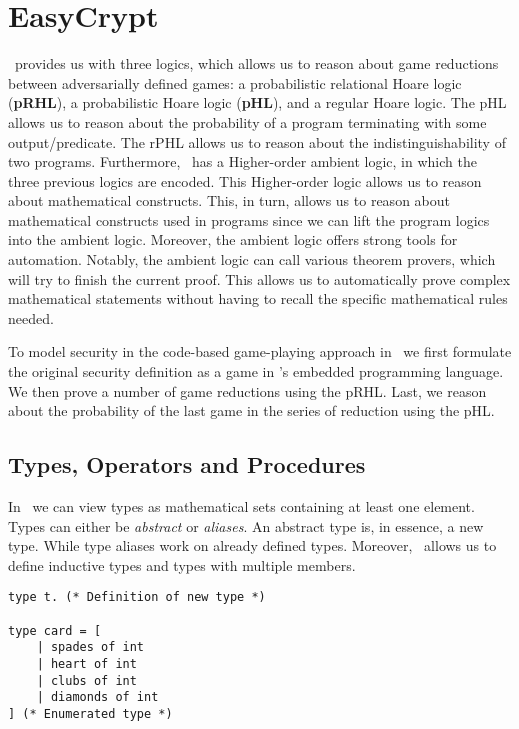 \section{EasyCrypt}
\label{sec:label}
\easycrypt\ provides us with three logics, which allows us to reason about game
reductions between adversarially defined games: a probabilistic relational
Hoare logic (\textbf{pRHL}), a probabilistic Hoare logic (\textbf{pHL}), and a
regular Hoare logic.
The pHL allows us to reason about the probability of a program terminating with
some output/predicate.
The rPHL allows us to reason about the
indistinguishability of two programs.
Furthermore, \easycrypt\ has a Higher-order ambient logic, in which the three
previous logics are encoded.
This Higher-order logic allows us to reason about mathematical constructs. This,
in turn, allows us to reason about mathematical constructs used in programs
since we can lift the program logics into the ambient logic.
Moreover, the ambient logic offers strong tools for automation. Notably, the
ambient logic can call various theorem provers, which will try to finish the
current proof. This allows us to automatically prove complex mathematical
statements without having to recall the specific mathematical rules needed.

To model security in the code-based game-playing approach in \easycrypt\ we
first formulate the original security definition as a game in \easycrypt's embedded
programming language. We then prove a number of game reductions using the pRHL.
Last, we reason about the probability of the last game in the series of
reduction using the pHL.


\subsection{Types, Operators and Procedures}
\label{sec:ec_types_and_operators}
In \easycrypt\ we can view types as mathematical sets containing at least one
element. Types can either be \textit{abstract} or \textit{aliases}. An abstract
type is, in essence, a new type. While type aliases work on already defined
types.
Moreover, \easycrypt\ allows us to define inductive types and types with
multiple members.
\begin{lstlisting}
type t. (* Definition of new type *)

type card = [
    | spades of int
    | heart of int
    | clubs of int
    | diamonds of int
] (* Enumerated type *)
\end{lstlisting}

